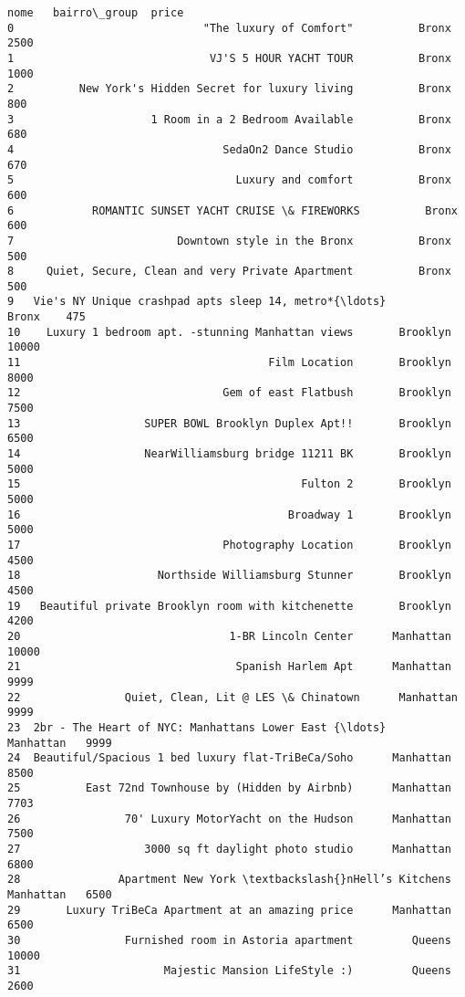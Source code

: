 \documentclass[11pt]{article}
\begin{document}
    \begin{Verbatim}[commandchars=\\\{\}]
                                                 nome   bairro\_group  price
0                             "The luxury of Comfort"          Bronx   2500
1                              VJ'S 5 HOUR YACHT TOUR          Bronx   1000
2          New York's Hidden Secret for luxury living          Bronx    800
3                     1 Room in a 2 Bedroom Available          Bronx    680
4                                SedaOn2 Dance Studio          Bronx    670
5                                  Luxury and comfort          Bronx    600
6            ROMANTIC SUNSET YACHT CRUISE \& FIREWORKS          Bronx    600
7                         Downtown style in the Bronx          Bronx    500
8     Quiet, Secure, Clean and very Private Apartment          Bronx    500
9   Vie's NY Unique crashpad apts sleep 14, metro*{\ldots}          Bronx    475
10    Luxury 1 bedroom apt. -stunning Manhattan views       Brooklyn  10000
11                                      Film Location       Brooklyn   8000
12                               Gem of east Flatbush       Brooklyn   7500
13                   SUPER BOWL Brooklyn Duplex Apt!!       Brooklyn   6500
14                   NearWilliamsburg bridge 11211 BK       Brooklyn   5000
15                                           Fulton 2       Brooklyn   5000
16                                         Broadway 1       Brooklyn   5000
17                               Photography Location       Brooklyn   4500
18                     Northside Williamsburg Stunner       Brooklyn   4500
19   Beautiful private Brooklyn room with kitchenette       Brooklyn   4200
20                                1-BR Lincoln Center      Manhattan  10000
21                                 Spanish Harlem Apt      Manhattan   9999
22                Quiet, Clean, Lit @ LES \& Chinatown      Manhattan   9999
23  2br - The Heart of NYC: Manhattans Lower East {\ldots}      Manhattan   9999
24  Beautiful/Spacious 1 bed luxury flat-TriBeCa/Soho      Manhattan   8500
25          East 72nd Townhouse by (Hidden by Airbnb)      Manhattan   7703
26                70' Luxury MotorYacht on the Hudson      Manhattan   7500
27                   3000 sq ft daylight photo studio      Manhattan   6800
28               Apartment New York \textbackslash{}nHell’s Kitchens      Manhattan   6500
29       Luxury TriBeCa Apartment at an amazing price      Manhattan   6500
30                Furnished room in Astoria apartment         Queens  10000
31                      Majestic Mansion LifeStyle :)         Queens   2600

\end{Verbatim}
\end{document}
